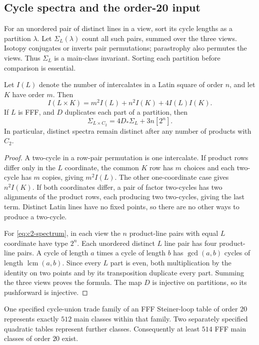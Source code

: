 \subsection{Cycle spectra and the order-20 input}

For an unordered pair of distinct lines in a view, sort its cycle lengths
as a partition $\lambda$. Let $\Sigma_L(\lambda)$ count all such pairs,
summed over the three views. Isotopy conjugates or inverts pair
permutations; parastrophy also permutes the views. Thus $\Sigma_L$ is a
main-class invariant. Sorting each partition before comparison is essential.

\begin{proposition}
\label{prop:product-spectrum}
Let $I(L)$ denote the number of intercalates in a Latin square of order
$n$, and let $K$ have order $m$. Then
\[
 I(L\times K)=m^2I(L)+n^2I(K)+4I(L)I(K).
\]
If $L$ is FFF, and $D$ duplicates each part of a partition, then
\begin{equation}
 \Sigma_{L\times C_2}=4D_*\Sigma_L+3n[2^n].
 \label{eq:c2-spectrum}
\end{equation}
In particular, distinct spectra remain distinct after any number of
products with $C_2$.
\end{proposition}

\begin{proof}
A two-cycle in a row-pair permutation is one intercalate. If product
rows differ only in the $L$ coordinate, the common $K$ row has $m$
choices and each two-cycle has $m$ copies, giving $m^2I(L)$.
The other one-coordinate case gives $n^2I(K)$. If both coordinates
differ, a pair of factor two-cycles has two alignments of the product
rows, each producing two two-cycles, giving the last term. Distinct
Latin lines have no fixed points, so there are no other ways to
produce a two-cycle.

For \eqref{eq:c2-spectrum}, in each view the $n$ product-line pairs
with equal $L$ coordinate have type $2^n$. Each unordered distinct
$L$ line pair has four product-line pairs. A cycle of length $a$
times a cycle of length $b$ has $\gcd(a,b)$ cycles of length
$\operatorname{lcm}(a,b)$. Since every $L$ part is even, both
multiplication by the identity on two points and by its transposition
duplicate every part. Summing the three views proves the formula.
The map $D$ is injective on partitions, so its pushforward is injective.
\end{proof}

\begin{computationaltheorem}
\label{cthm:fff20-514}
One specified cycle-union trade family of an FFF Steiner-loop table of
order $20$ represents exactly $512$ main classes within that family.
Two separately specified quadratic tables represent further classes.
Consequently at least $514$ FFF main classes of order $20$ exist.
\end{computationaltheorem}

